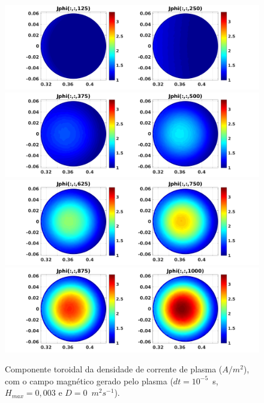 \documentclass[12pt,oneside,a4paper]{abntex2}
\begin{document}
\begin{figure}[H]
\centering
\includegraphics[scale=0.5]{../SImulacao_breakdown/PDE/Jphitod1B3.png}  
\includegraphics[scale=0.5]{../SImulacao_breakdown/PDE/Jphitod2B3.png} 
\includegraphics[scale=0.5]{../SImulacao_breakdown/PDE/Jphitod3B3.png} 
\includegraphics[scale=0.5]{../SImulacao_breakdown/PDE/Jphitod4B3.png} 
\caption{Componente toroidal da densidade de corrente de plasma ($A/m^2$), com o campo magnético gerado pelo plasma ($dt=10^{-5}$\ s, $H_{max} = 0,003$ e $D=0$\ $m^2s^{-1}$).}
\label{campplasmasil2}
\end{figure}
\end{document}
